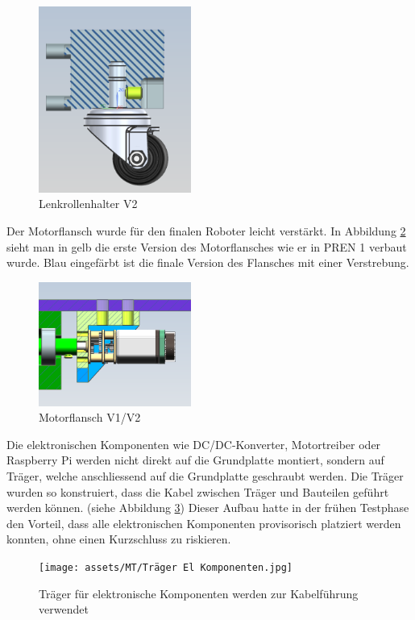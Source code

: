 \begin{figure}[H]
\centering
\includegraphics[width=5cm]{assets/MT/Lenkrollenhalter V2.png}
\caption{Lenkrollenhalter V2}
\label{fig: Lenkrollenhalter V2}
\end{figure}

Der Motorflansch wurde für den finalen Roboter leicht verstärkt. In Abbildung \ref{fig: Motorflansch V1/V2} sieht man in gelb die erste Version des Motorflansches wie er in PREN 1 verbaut wurde. Blau eingefärbt ist die finale Version des Flansches mit einer Verstrebung. 

\begin{figure}[H]
\centering
\includegraphics[width=5cm]{assets/MT/Motorflansch Vergleich.png}
\caption{Motorflansch V1/V2}
\label{fig: Motorflansch V1/V2}
\end{figure}

Die elektronischen Komponenten wie DC/DC-Konverter, Motortreiber oder Raspberry Pi werden nicht direkt auf die Grundplatte montiert, sondern auf Träger, welche anschliessend auf die Grundplatte geschraubt werden. Die Träger wurden so konstruiert, dass die Kabel zwischen Träger und Bauteilen geführt werden können. (siehe Abbildung \ref{fig: Träger für elektronische Komponenten}) Dieser Aufbau hatte in der frühen Testphase den Vorteil, dass alle elektronischen Komponenten provisorisch platziert werden konnten, ohne einen Kurzschluss zu riskieren. 

\begin{figure}[H]
\centering
\texttt{[image: assets/MT/Träger El Komponenten.jpg]}
\caption{Träger für elektronische Komponenten werden zur Kabelführung verwendet}
\label{fig: Träger für elektronische Komponenten}
\end{figure}

